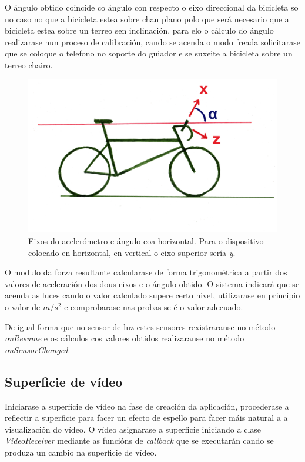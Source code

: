 O ángulo obtido coincide co ángulo con respecto o eixo direccional da bicicleta so no caso no que a bicicleta estea sobre chan plano polo que será necesario que a bicicleta estea sobre un terreo sen inclinación, para elo o cálculo do ángulo realizarase nun proceso de calibración, cando se acenda o modo freada solicitarase que se coloque o telefono no soporte do guiador e se suxeite a bicicleta sobre un terreo chairo.
\begin{figure}[tb]
  \centering
  \includegraphics[scale=.6]{imaxes/angulo.png}
  \caption{Eixos do acelerómetro e ángulo coa horizontal. Para o dispositivo colocado en horizontal, en vertical o eixo superior sería \emph{y}.}
  \label{fig:angulo}
\end{figure}

O modulo da forza resultante calcularase de forma trigonométrica a partir dos valores de aceleración dos dous eixos e o ángulo obtido. O sistema indicará que se acenda as luces cando o valor calculado supere certo nivel, utilizarase en principio o valor de $m/s^2$ e comprobarase nas probas se é o valor adecuado.

De igual forma que no sensor de luz estes sensores rexistraranse no método \emph{onResume} e os cálculos cos valores obtidos realizaranse no método \emph{onSensorChanged}.

\subsection{Superficie de vídeo}
Iniciarase a superficie de vídeo na fase de creación da aplicación, procederase a reflectir a superficie para facer un efecto de espello para facer máis natural a a visualización do vídeo. O vídeo asignarase a superficie iniciando a clase \emph{VideoReceiver} mediante as funcións de \emph{callback} que se executarán cando se produza un cambio na superficie de vídeo.


